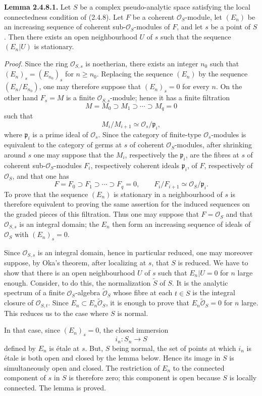 \documentclass[11pt]{article}
\begin{document}
\textbf{Lemma 2.4.8.1.} Let $S$ be a complex pseudo-analytic space satisfying the local connectedness condition of (2.4.8). Let $F$ be a coherent $\mathcal O_S$-module, let $(E_n)$ be an increasing sequence of coherent sub-$\mathcal O_S$-modules of $F$, and let $s$ be a point of $S$. Then there exists an open neighbourhood $U$ of $s$ such that the sequence $(E_n|U)$ is stationary.

\emph{Proof.} Since the ring $\mathcal O_{S,s}$ is noetherian, there exists an integer $n_0$ such that $(E_n)_s=(E_{n_0})_s$ for $n\geq n_0$. Replacing the sequence $(E_n)$ by the sequence $(E_n/E_{n_0})$, one may therefore suppose that $(E_n)_s=0$ for every $n$. On the other hand $F_s=M$ is a finite $\mathcal O_{S,s}$-module; hence it has a finite filtration
\[
 M=M_0\supset M_1\supset\cdots\supset M_q=0
\]
such that
\[
 M_i/M_{i+1}\simeq \mathcal O_s/\mathfrak p_i,
\]
where $\mathfrak p_i$ is a prime ideal of $\mathcal O_s$. Since the category of finite-type $\mathcal O_s$-modules is equivalent to the category of germs at $s$ of coherent $\mathcal O_S$-modules, after shrinking around $s$ one may suppose that the $M_i$, respectively the $\mathfrak p_i$, are the fibres at $s$ of coherent sub-$\mathcal O_S$-modules $F_i$, respectively coherent ideals $\mathfrak p_i$, of $F$, respectively of $\mathcal O_S$, and that one has
\[
 F=F_0\supset F_1\supset\cdots\supset F_q=0,
 \qquad F_i/F_{i+1}\simeq\mathcal O_S/\mathfrak p_i.
\]
To prove that the sequence $(E_n)$ is stationary in a neighbourhood of $s$ is therefore equivalent to proving the same assertion for the induced sequences on the graded pieces of this filtration. Thus one may suppose that $F=\mathcal O_S$ and that $\mathcal O_{S,s}$ is an integral domain; the $E_n$ then form an increasing sequence of ideals of $\mathcal O_S$ with $(E_n)_s=0$.

Since $\mathcal O_{S,s}$ is an integral domain, hence in particular reduced, one may moreover suppose, by Oka's theorem, after localizing at $s$, that $S$ is reduced. We have to show that there is an open neighbourhood $U$ of $s$ such that $E_n|U=0$ for $n$ large enough. Consider, to do this, the normalization $\widetilde S$ of $S$. It is the analytic spectrum of a finite $\mathcal O_S$-algebra $\widetilde{\mathcal O}_S$ whose fibre at each $t\in S$ is the integral closure of $\mathcal O_{S,t}$. Since $E_n\subset E_n\widetilde{\mathcal O}_S$, it is enough to prove that $E_n\widetilde{\mathcal O}_S=0$ for $n$ large. This reduces us to the case where $S$ is normal.

In that case, since $(E_n)_s=0$, the closed immersion
\[
 i_n:S_n\longrightarrow S
\]
defined by $E_n$ is étale at $s$. But, $S$ being normal, the set of points at which $i_n$ is étale is both open and closed by the lemma below. Hence its image in $S$ is simultaneously open and closed. The restriction of $E_n$ to the connected component of $s$ in $S$ is therefore zero; this component is open because $S$ is locally connected. The lemma is proved.
\end{document}
